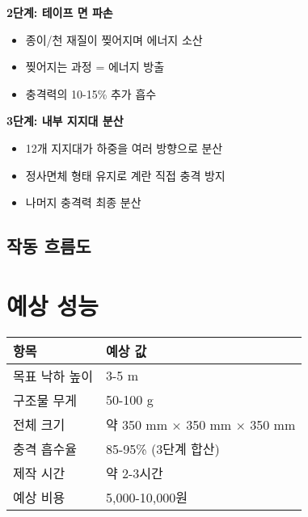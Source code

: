 \documentclass[a4paper,12pt]{article}
\begin{document}
\begin{CJK}{UTF8}{mj}
\textbf{2단계: 테이프 면 파손}
\begin{itemize}
    \item 종이/천 재질이 찢어지며 에너지 소산
    \item 찢어지는 과정 = 에너지 방출
    \item 충격력의 10-15\% 추가 흡수
\end{itemize}

\textbf{3단계: 내부 지지대 분산}
\begin{itemize}
    \item 12개 지지대가 하중을 여러 방향으로 분산
    \item 정사면체 형태 유지로 계란 직접 충격 방지
    \item 나머지 충격력 최종 분산
\end{itemize}

\subsection{작동 흐름도}

\begin{center}
\end{center}

\section{예상 성능}

\begin{center}
\begin{tabular}{ll}
\toprule
\textbf{항목} & \textbf{예상 값} \\
\midrule
목표 낙하 높이 & 3-5 m \\
구조물 무게 & 50-100 g \\
전체 크기 & 약 350 mm $\times$ 350 mm $\times$ 350 mm \\
충격 흡수율 & 85-95\% (3단계 합산) \\
제작 시간 & 약 2-3시간 \\
예상 비용 & 5,000-10,000원 \\
\bottomrule
\end{tabular}
\end{center}


\end{CJK}
\end{document}
